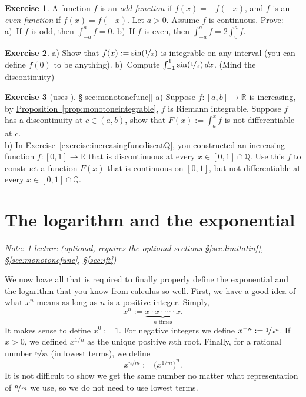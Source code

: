 \documentclass[12pt]{book}
\newcommand{\R}{{\mathbb{R}}}
\newcommand{\Q}{{\mathbb{Q}}}
\newcommand{\myindex}[1]{#1\index{#1}}
\newcommand{\sectionnotes}[1]{\noindent \emph{Note: #1} \medskip \par}
\newcommand{\sectionnewpage}{\clearpage}
\theoremstyle{plain}
\theoremstyle{remark}
\theoremstyle{definition}
\theoremstyle{exercise}
\newtheorem{exercise}{Exercise}[section]
\theoremstyle{example}
\newcommand{\sectionref}[1]{\hyperref[#1]{\S\ref*{#1}}}
\newcommand{\exerciseref}[1]{\hyperref[#1]{Exercise~\ref*{#1}}}
\newcommand{\propref}[1]{\hyperref[#1]{Proposition~\ref*{#1}}}
\begin{document}
\begin{exercise}
A function $f$ is an \emph{\myindex{odd function}} if $f(x) = -f(-x)$,
and $f$ is an \emph{\myindex{even function}} if $f(x) = f(-x)$.  Let $a >
0$.  Assume $f$ is continuous.  Prove: a)~If $f$ is odd, then $\int_{-a}^a f
= 0$.  b)~If $f$ is even, then $\int_{-a}^a f = 2 \int_0^a f$.
\end{exercise}

\begin{exercise}
a) Show that $f(x) := \sin(\nicefrac{1}{x})$
is integrable on any interval (you can define $f(0)$ to be anything).
b)~Compute $\int_{-1}^1 \sin(\nicefrac{1}{x})\,dx$.  (Mind the
discontinuity)
\end{exercise}

\begin{exercise}[uses \sectionref{sec:monotonefunc}]
a) Suppose $f \colon [a,b] \to \R$ is increasing, by
\propref{prop:monotoneintegrable},
$f$ is Riemann integrable.  Suppose $f$ has a discontinuity at $c \in
(a,b)$, show that $F(x) := \int_a^x f$ is not differentiable at $c$.
\\
b) In \exerciseref{exercise:increasingfuncdiscatQ}, you constructed an increasing
function $f \colon [0,1] \to \R$ that is discontinuous at every
$x \in [0,1] \cap \Q$.  Use this $f$ to construct a function $F(x)$ that is
continuous on $[0,1]$, but not differentiable at every $x \in [0,1] \cap \Q$.
\end{exercise}


\sectionnewpage
\section{The logarithm and the exponential}
\label{sec:logandexp}

\sectionnotes{1 lecture (optional, requires the optional sections 
\sectionref{sec:limitatinf},
\sectionref{sec:monotonefunc},
\sectionref{sec:ift})}

We now have all that is required to finally properly define the exponential
and the
logarithm that you know from calculus so well.
First, we have a good idea of what $x^n$ means as long as
$n$ is a positive integer.  Simply,
\begin{equation*}
x^n := \underbrace{x \cdot x \cdot \cdots \cdot x}_{\text{$n$ times}} .
\end{equation*}
It makes sense to define $x^0 := 1$.
For negative integers we define $x^{-n} := \nicefrac{1}{x^n}$.
If $x > 0$,
we defined $x^{1/n}$ as
the unique positive $n$th root.  Finally, for a rational
number $\nicefrac{n}{m}$ (in lowest terms), we define
\begin{equation*}
x^{n/m} := {\bigl(x^{1/m}\bigr)}^n .
\end{equation*}
It is not difficult to show 
we get the same number no matter what
representation of $\nicefrac{n}{m}$ we use, so we do not need to use
lowest terms.
\end{document}
